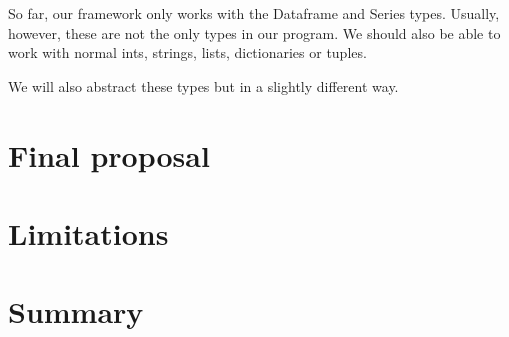 So far, our framework only works with the Dataframe and Series types.
Usually, however, these are not the only types in our program.
We should also be able to work with normal ints, strings, lists, dictionaries or tuples.

We will also abstract these types but in a slightly different way.

\section{Final proposal}


\section{Limitations}


\section*{Summary}
